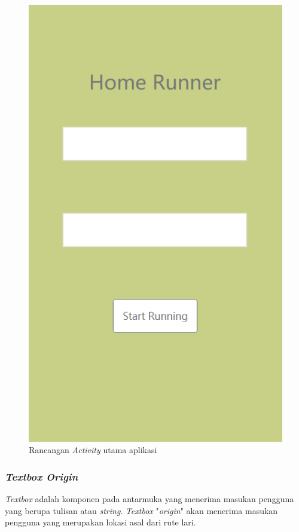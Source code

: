 \begin{figure}[!hp]
  \centering
    \includegraphics[scale=0.7]{Gambar/mockup-main-activity.png}
    \caption{Rancangan \textit{Activity} utama aplikasi}\label{fig:main-page}
\end{figure}


\subsubsection{\textit{Textbox Origin}} 
\textit{Textbox} adalah komponen pada antarmuka yang menerima masukan pengguna yang berupa tulisan atau \textit{string}. \textit{Textbox} "\textit{origin}" akan menerima masukan pengguna yang merupakan lokasi asal dari rute lari.


